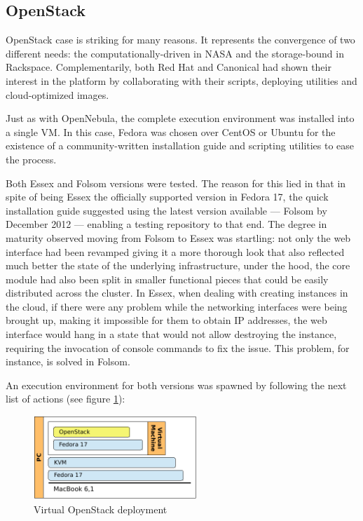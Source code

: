 \subsection{OpenStack}\label{subsec:openstack}

\noindent OpenStack case is striking for many reasons. It represents the convergence of two different needs: the computationally-driven in NASA and the storage-bound in Rackspace. Complementarily, both Red Hat and Canonical had shown their interest in the platform by collaborating with their scripts, deploying utilities and cloud-optimized images.

Just as with OpenNebula, the complete execution environment was installed into a single VM. In this case, Fedora was chosen over CentOS or Ubuntu for the existence of a community-written installation guide \cite{quickstartfedoraos} and scripting utilities to ease the process.

Both Essex and Folsom versions were tested. The reason for this lied in that in spite of being Essex the officially supported version in Fedora 17, the quick installation guide suggested using the latest version available --- Folsom by December 2012 --- enabling a testing repository to that end. The degree in maturity observed moving from Folsom to Essex was startling: not only the web interface had been revamped giving it a more thorough look that also reflected much better the state of the underlying infrastructure, under the hood, the core module had also been split in smaller functional pieces that could be easily distributed across the cluster. In Essex, when dealing with creating instances in the cloud, if there were any problem while the networking interfaces were being brought up, making it impossible for them to obtain IP addresses, the web interface would hang in a state that would not allow destroying the instance, requiring the invocation of console commands to fix the issue. This problem, for instance, is solved in Folsom.

An execution environment for both versions was spawned by following the next list of actions (see figure \ref{fig:openstack}):

\begin{figure}[tbp]
\begin{center}
\includegraphics[width=0.55\textwidth]{imagenes/010.pdf}
 \caption{Virtual OpenStack deployment}
\label{fig:openstack}
\end{center}
\end{figure}

